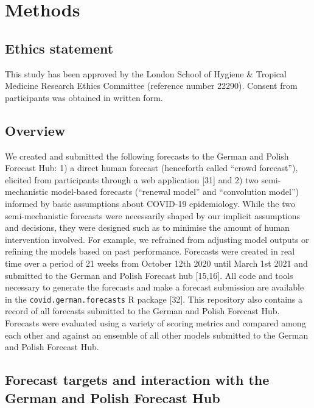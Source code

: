 \documentclass[10pt,letterpaper]{article}
\begin{document}
\hypertarget{methods}{%
\section{Methods}\label{methods}}

\hypertarget{ethics-statement}{%
\subsection{Ethics statement}\label{ethics-statement}}

This study has been approved by the London School of Hygiene \& Tropical
Medicine Research Ethics Committee (reference number 22290). Consent
from participants was obtained in written form.

\hypertarget{overview}{%
\subsection{Overview}\label{overview}}

We created and submitted the following forecasts to the German and
Polish Forecast Hub: 1) a direct human forecast (henceforth called
``crowd forecast''), elicited from participants through a web
application {[}31{]} and 2) two semi-mechanistic model-based forecasts
(``renewal model'' and ``convolution model'') informed by basic
assumptions about COVID-19 epidemiology. While the two semi-mechanistic
forecasts were necessarily shaped by our implicit assumptions and
decisions, they were designed such as to minimise the amount of human
intervention involved. For example, we refrained from adjusting model
outputs or refining the models based on past performance. Forecasts were
created in real time over a period of 21 weeks from October 12th 2020
until March 1st 2021 and submitted to the German and Polish Forecast hub
{[}15,16{]}. All code and tools necessary to generate the forecasts and
make a forecast submission are available in the
\texttt{covid.german.forecasts} R package {[}32{]}. This repository also
contains a record of all forecasts submitted to the German and Polish
Forecast Hub. Forecasts were evaluated using a variety of scoring
metrics and compared among each other and against an ensemble of all
other models submitted to the German and Polish Forecast Hub.

\hypertarget{forecast-targets-and-interaction-with-the-german-and-polish-forecast-hub}{%
\subsection{Forecast targets and interaction with the German and Polish
Forecast
Hub}\label{forecast-targets-and-interaction-with-the-german-and-polish-forecast-hub}}
\end{document}
